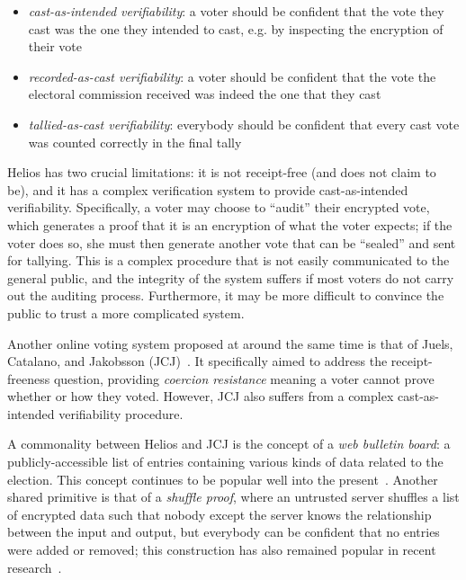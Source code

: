\documentclass[12pt,a4paper]{article}
\theoremstyle{definition}
\begin{document}
\begin{itemize}
    \item \textit{cast-as-intended verifiability}: a voter should be confident that the vote they cast was the one they intended to cast, e.g. by inspecting the encryption of their vote
    \item \textit{recorded-as-cast verifiability}: a voter should be confident that the vote the electoral commission received was indeed the one that they cast
    \item \textit{tallied-as-cast verifiability}: everybody should be confident that every cast vote was counted correctly in the final tally
\end{itemize}

Helios has two crucial limitations: it is not receipt-free (and does not claim to be), and it has a complex verification system to provide cast-as-intended verifiability. Specifically, a voter may choose to ``audit'' their encrypted vote, which generates a proof that it is an encryption of what the voter expects; if the voter does so, she must then generate another vote that can be ``sealed'' and sent for tallying. This is a complex procedure that is not easily communicated to the general public, and the integrity of the system suffers if most voters do not carry out the auditing process. Furthermore, it may be more difficult to convince the public to trust a more complicated system.

Another online voting system proposed at around the same time is that of Juels, Catalano, and Jakobsson (JCJ)~\cite{juels2010coercion}. It specifically aimed to address the receipt-freeness question, providing \textit{coercion resistance} meaning a voter cannot prove whether or how they voted. However, JCJ also suffers from a complex cast-as-intended verifiability procedure.

A commonality between Helios and JCJ is the concept of a \textit{web bulletin board}: a publicly-accessible list of entries containing various kinds of data related to the election. This concept continues to be popular well into the present~\cite{kiayias2018security}. Another shared primitive is that of a \textit{shuffle proof}, where an untrusted server shuffles a list of encrypted data such that nobody except the server knows the relationship between the input and output, but everybody can be confident that no entries were added or removed; this construction has also remained popular in recent research~\cite{cortier2017machine}.
\end{document}

